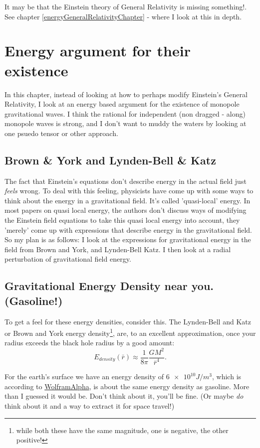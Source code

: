 \documentclass[../rzero]{subfiles}
\begin{document}
It may be that the Einstein theory of General Relativity is missing something!\cite{08092323EnergyMomentumGravitational}. See chapter \ref{energyGeneralRelativityChapter} - where I look at this in depth. 

\section{Energy argument for their existence}
In this chapter, instead of looking at how to perhaps modify Einstein's General Relativity, I look at an energy based argument for the existence of monopole gravitational waves. I think the rational for independent (non dragged - along) monopole waves is strong, and I don't want to muddy the waters by looking at one psuedo tensor or other approach.  

\subsection{Brown \& York and Lynden-Bell \& Katz}
The fact that Einstein's equations don't describe energy in the actual field just \textit{feels} wrong. To deal with this feeling, physicists have come up with some ways to think about the energy in a gravitational field. It's called 'quasi-local' energy. In most papers on quasi local energy, the authors don't discuss ways of modifying the Einstein field equations to take this quasi local energy into account, they 'merely' come up with expressions that describe energy in the gravitational field. So my plan is as follows: I look at the expressions for gravitational energy in the field from Brown and York\cite{Brown1993}, and Lynden-Bell Katz\cite{lyndenbell1985}. I then look at a radial perturbation of gravitational field energy.

\subsection{Gravitational Energy Density near you. (Gasoline!)}
To get a feel for these energy densities, consider this. The Lynden-Bell and Katz or Brown and York energy density\footnote{while both these have the same magnitude, one is negative, the other positive!}, are, to an excellent approximation, once your radius exceeds the black hole radius by a good amount: 
\begin{equation}
 E_{density}(\bar r) \approx \frac{1}{8 \pi}\frac{GM^2}{\bar r^4}.
\end{equation}

For the earth's surface we have an energy density of $\num{6e10} J/m^3$, which is according to \href{https://www.wolframalpha.com/input?i=G*%28mass+of+earth%29%5E2%2F%28%288*pi%29%286300km%29%5E4%29+in+J%2Fm%5E3}{WolframAlpha}, is about the same energy density as gasoline. More than I guessed it would be. Don't think about it, you'll be fine. (Or maybe \textit{do} think about it and a way to extract it for space travel!)
\end{document}
